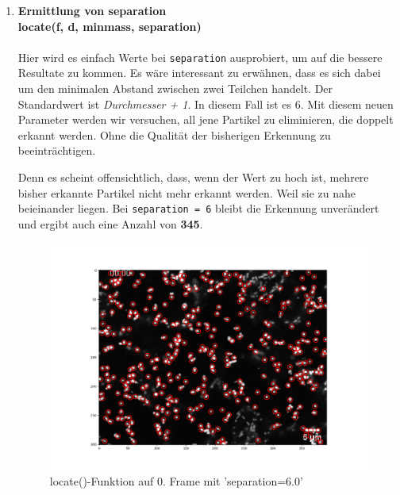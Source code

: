 \begin{enumerate}
		\item {\large \textbf{Ermittlung von \textbf{separation}}} \\
		\textbf{locate(f, d, minmass, separation)} \\ \\
    			Hier wird es einfach Werte bei \texttt{separation} ausprobiert, um auf die bessere Resultate zu kommen. 
    			Es wäre interessant zu erwähnen, dass es sich dabei um den minimalen Abstand zwischen zwei Teilchen handelt. Der Standardwert ist \textit{Durchmesser + 1}. In diesem Fall ist es 6. 
Mit diesem neuen Parameter werden wir versuchen, all jene Partikel zu eliminieren, die doppelt erkannt werden. Ohne die Qualität der bisherigen Erkennung zu beeinträchtigen.  

Denn es scheint offensichtlich, dass, wenn der Wert zu hoch ist, mehrere bisher erkannte Partikel nicht mehr erkannt werden. Weil sie zu nahe beieinander liegen.
Bei \texttt{separation = 6} bleibt die Erkennung unverändert und ergibt auch eine Anzahl von \textbf{345}.

\begin{figure}[H]
    \centering
    \includegraphics[scale=0.35]{Grafiken/trackpyBilder/locate_with_separation_(6).png}
    \caption{locate()-Funktion auf 0. Frame mit 'separation=6.0'}
    \label{fig:kap3_sep=6}
\end{figure}


\end{enumerate}
